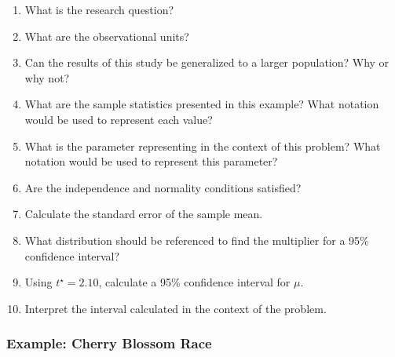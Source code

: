 \documentclass[
]{report}
\newcommand{\rgs}{\vspace{12pt}} %
\begin{document}
\begin{enumerate}
\def\labelenumi{\arabic{enumi}.}
\item
  What is the research question?
  \rgs 
\item
  What are the observational units?
  \rgs 
\item
  Can the results of this study be generalized to a larger population? Why or why not?
  \rgs 
\item
  What are the sample statistics presented in this example? What notation would be used to represent each value?
  \rgs 
\item
  What is the parameter representing in the context of this problem? What notation would be used to represent this parameter?
  \rgs 
  \rgs 
\item
  Are the independence and normality conditions satisfied?
  \rgs 
  \rgs 
\item
  Calculate the standard error of the sample mean.
  \rgs 
  \rgs
\item
  What distribution should be referenced to find the multiplier for a 95\% confidence interval?
  \rgs 
\item
  Using \(t^\star=2.10\), calculate a 95\% confidence interval for \(\mu\).
  \rgs 
  \rgs
\item
  Interpret the interval calculated in the context of the problem.
  \rgs 
  \rgs 
\end{enumerate}

\hypertarget{example-cherry-blossom-race}{%
\subsubsection*{Example: Cherry Blossom Race}\label{example-cherry-blossom-race}}
\end{document}
